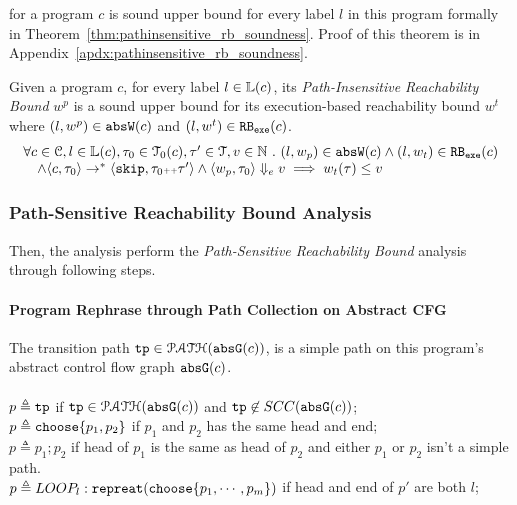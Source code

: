 for a program $c$ is sound upper bound for every label $l$ in this program formally in Theorem~\ref{thm:pathinsensitive_rb_soundness}. Proof of this theorem is in Appendix~\ref{apdx:pathinsensitive_rb_soundness}.
%
\begin{thm}
  \label{thm:pathinsensitive_rb_soundness}
Given a program ${c}$, for every label $l \in \mathbb{L}(c)$,
its \emph{Path-Insensitive Reachability Bound} $w^p$ 
 is a sound upper bound for its 
 execution-based reachability bound $w^t$ 
 where $(l, w^p) \in \mathtt{abs}{\mathtt{W}}(c)$ and  $(l, w^t) \in \mathtt{RB_{exe}}(c)$.
  \[
    \begin{array}{l}
      \forall c \in \mathcal{C}, l \in \mathbb{L}(c),\mathtt{\tau}_0 \in \mathcal{T}_0(c), 
      \mathtt{\tau}' \in \mathcal{T}, v \in \mathbb{N}
       ~.~ 
      (l, w_p) \in \mathtt{abs}{\mathtt{W}}(c)
      \land 
      (l, w_t) \in \mathtt{RB_{exe}}(c)
      \\ \quad
      \land \langle {c}, \mathtt{\tau}_0 \rangle \to^{*} \langle \mathtt{skip}, \mathtt{\tau}_0{\scriptscriptstyle ++}\mathtt{\tau}' \rangle 
      \land 
      \langle w_{p}, \mathtt{\tau}_0 \rangle \Downarrow_e v
      \implies
      w_{t}(\mathtt{\tau}) \leq v
    \end{array}
    \]
\end{thm}

\subsubsection{Path-Sensitive Reachability Bound Analysis}
\label{sec:pathsensitive_rb}
Then, the analysis perform the \emph{Path-Sensitive Reachability Bound} analysis through following steps.
%
\paragraph*{Program Rephrase through Path Collection on Abstract CFG}
The transition path
$\mathtt{tp} \in \mathcal{PATH}(\mathtt{abs}{\mathtt{G}}(c))$, is a simple path on this program's abstract control flow graph $\mathtt{abs}{\mathtt{G}}(c)$.
\\
\\
$p \triangleq \mathtt{tp} $ if $\mathtt{tp} \in \mathcal{PATH}(\mathtt{abs}{\mathtt{G}}(c))$ and $\mathtt{tp} \not\in SCC(\mathtt{abs}{\mathtt{G}}(c))$;
\\
$p \triangleq \mathtt{choose}\{p_1, p_2 \}$ if $p_1$ and $p_2$ has the same head and end;
\\
$p \triangleq p_1; p_2$ if head of $p_1$ is the same as head of $p_2$ and either $p_1$ or $p_2$ isn't a simple path. 
\\
$p \triangleq LOOP_l : \mathtt{repreat}(\mathtt{choose}\{p_1, \cdots, p_m\})$ if head and end of $p'$ are both $l$;
%
